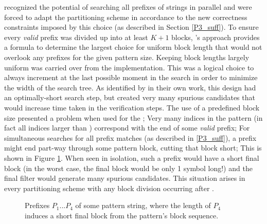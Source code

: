 {\vali{} recognized the potential of searching all prefixes of strings in parallel and were forced to adapt the \gls{partitioning scheme} in accordance to the new correctness constraints imposed by this choice (as described in Section \ref{P3_suff}). To ensure every \textit{valid} prefix was divided up into at least $K+1$ blocks, \vali{}'s approach provides a formula to determine the largest choice for uniform block length that would not overlook any prefixes for the given \gls{pattern} size. Keeping block lengths largely uniform was carried over from the \kark{} implementation. This was a logical choice to always increment  at the last possible moment in the search in order to minimize the width of the search tree. As identified by \kark{} in their own work, this design had an optimally-short \gls{search step}, but created very many spurious \glspl{candidate} that would increase time taken in the \glspl{verification step}. The use of a predefined block size presented a problem when used for the \aspop{}; Very many indices in the pattern (in fact all indices larger than ) correspond with the end of some \textit{valid} prefix; For simultaneous searches for all prefix matches (as described in \ref{P3_suff}), a prefix might end part-way through some pattern block, cutting that block short; This is shown in Figure \ref{fig:short_block}. When seen in isolation, such a prefix would have a short final block (in the worst case, the final block would be only 1 symbol long!) and the final filter would generate many spurious candidates. This situation arises in every partitioning scheme with any block division occurring after .

\begin{figure}[!htb]
\centering
{}
\caption[Short final block in some prefix of a pattern demonstrated]{Prefixes $P_1...P_4$ of some pattern string, where the length of $P_4$ induces a short final block from the pattern's block sequence.}
\label{fig:short_block}
\end{figure}
 
}

